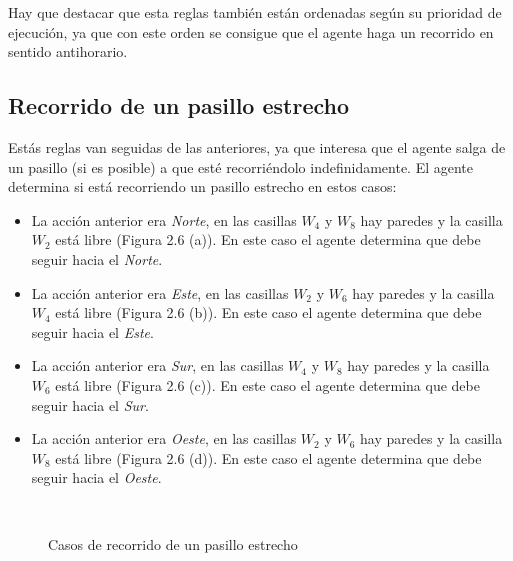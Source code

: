 Hay que destacar que esta reglas también están ordenadas según su prioridad de ejecución, ya que con este orden se consigue que el agente haga un recorrido en sentido antihorario.

\subsection{Recorrido de un pasillo estrecho}
Estás reglas van seguidas de las anteriores, ya que interesa que el agente salga de un pasillo (si es posible) a que esté recorriéndolo indefinidamente. El agente determina si está recorriendo un pasillo estrecho en estos casos:

\begin{itemize}
    \item La acción anterior era \emph{Norte}, en las casillas \emph{$W_{4}$} y \emph{$W_{8}$} hay paredes y la casilla \emph{$W_{2}$} está libre (Figura 2.6 (a)). En este caso el agente determina que debe seguir hacia el \emph{Norte}.
    
    \item La acción anterior era \emph{Este}, en las casillas \emph{$W_{2}$} y \emph{$W_{6}$} hay paredes y la casilla \emph{$W_{4}$} está libre (Figura 2.6 (b)). En este caso el agente determina que debe seguir hacia el \emph{Este}.
    
    \item La acción anterior era \emph{Sur}, en las casillas \emph{$W_{4}$} y \emph{$W_{8}$} hay paredes y la casilla \emph{$W_{6}$} está libre (Figura 2.6 (c)). En este caso el agente determina que debe seguir hacia el \emph{Sur}.
    
    \item La acción anterior era \emph{Oeste}, en las casillas \emph{$W_{2}$} y \emph{$W_{6}$} hay paredes y la casilla \emph{$W_{8}$} está libre (Figura 2.6 (d)). En este caso el agente determina que debe seguir hacia el \emph{Oeste}.
\end{itemize}

\begin{figure}[htb]
\centering
  \hspace{1em}
  \\
  \hspace{1em}
  \caption{Casos de recorrido de un pasillo estrecho}\label{fig:seguir_pasillo}
\end{figure}

